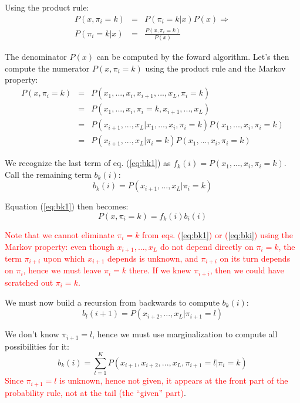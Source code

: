 Using the product rule:
\begin{eqnarray}
P(x, \pi_i = k) & = & P(\pi_i = k | x) P(x) \Rightarrow \\
P(\pi_i = k | x) & = & \frac{P(x, \pi_i = k)}{P(x)}
\label{eq:bk3}
\end{eqnarray}

The denominator $P(x)$ can be computed by the foward algorithm.
Let's then compute the numerator $P(x, \pi_i = k)$ using the product rule and the Markov property:
\begin{eqnarray}
P(x, \pi_i = k) 
& = & P(x_1, ..., x_i, x_{i+1}, ..., x_L, \pi_i=k) \nonumber \\
& = & P(x_1, ..., x_i, \pi_i=k, x_{i+1}, ..., x_L) \nonumber \\
& = & 
P(x_{i+1}, ..., x_L | x_1, ..., x_i, \pi_i=k)
P(x_1, ..., x_i, \pi_i=k) \nonumber \\
& = & 
P(x_{i+1}, ..., x_L | \pi_i=k)
P(x_1, ..., x_i, \pi_i=k)
\label{eq:bk1}
\end{eqnarray}

We recognize the last term of eq. (\ref{eq:bk1}) as $f_k(i)=P(x_1, ..., x_i, \pi_i=k)$. Call the remaining term $b_k(i)$:
\begin{equation}
b_k(i) = P(x_{i+1}, ..., x_L | \pi_i=k)
\label{eq:bki}
\end{equation}

Equation (\ref{eq:bk1})  then becomes:
\begin{equation}
P(x, \pi_i = k) = f_k(i) b_i(i)
\label{eq:bk2}
\end{equation}

\textcolor{red}{Note that we cannot eliminate $\pi_i=k$ from eqs.
(\ref{eq:bk1}) or (\ref{eq:bki})
using the Markov property: even though $x_{i+1}, ..., x_L$ do not depend directly on $\pi_i=k$, the term $\pi_{i+i}$ upon which $x_{i+1}$ depends is unknown, and $\pi_{i+i}$ on its turn depends on $\pi_i$, hence we must leave $\pi_i=k$ there. If we knew $\pi_{i+i}$, then we could have scratched out $\pi_i=k$.}

We must now build a recursion from backwards to compute $b_k(i)$:
\begin{equation}
b_l(i+1) = P(x_{i+2}, ..., x_L | \pi_{i+1}=l)
\label{eq:bkli1}
\end{equation}

We don't know $\pi_{i+1}=l$, hence we must use marginalization to compute all possibilities for it:
\begin{equation}
b_k(i) = \sum_{l=1}^K P(x_{i+1}, x_{i+2}, ..., x_L, \pi_{i+1}=l | \pi_i=k)
\end{equation}
\textcolor{red}{Since $\pi_{i+1}=l$ is unknown, hence not given, it appears at the front part of the probability rule, not at the tail (the ``given'' part)}.

